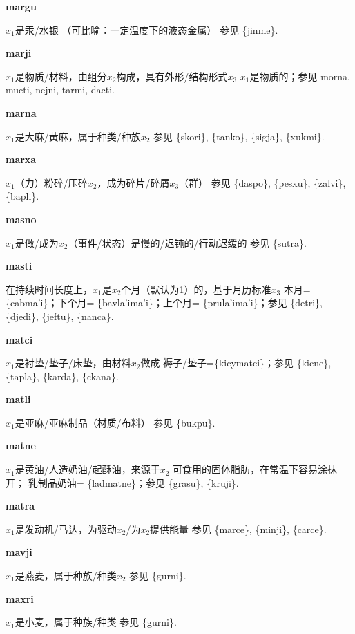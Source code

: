 \documentclass[notitlepage,twocolumn,a4paper,10pt]{book}
\begin{document}
{\sffamily\bfseries margu}\enspace {\ttfamily\bfseries[mag]}  $x_1$是汞\slash{}水银 （可比喻：一定温度下的液态金属） \textemdash{} 参见 \{jinme\}.

{\sffamily\bfseries marji}  $x_1$是物质\slash{}材料，由组分$x_2$构成，具有外形\slash{}结构形式$x_3$ \textemdash{} $x_1$是物质的；参见 {morna}, {mucti}, {nejni}, {tarmi}, {dacti}.

{\sffamily\bfseries marna} $x_1$是大麻\slash{}黄麻，属于种类\slash{}种族$x_2$ \textemdash{} 参见 \{skori\}, \{tanko\}, \{sigja\}, \{xukmi\}.

{\sffamily\bfseries marxa}\enspace {\ttfamily\bfseries[max]}  $x_1$（力）粉碎\slash{}压碎$x_2$，成为碎片\slash{}碎屑$x_3$（群） \textemdash{} 参见 \{daspo\}, \{pesxu\}, \{zalvi\}, \{bapli\}.

{\sffamily\bfseries masno}\enspace {\ttfamily\bfseries[    sno]}  $x_1$是做\slash{}成为$x_2$（事件\slash{}状态）是慢的\slash{}迟钝的\slash{}行动迟缓的 \textemdash{} 参见 \{sutra\}.

{\sffamily\bfseries masti}\enspace {\ttfamily\bfseries[        ma'i]}  在持续时间长度上，$x_1$是$x_2$个月（默认为1）的，基于月历标准$x_3$ \textemdash{} 本月= \{cabma'i\}；下个月= \{bavla'ima'i\}；上个月= \{prula'ima'i\}；参见 \{detri\}, \{djedi\}, \{jeftu\}, \{nanca\}.

{\sffamily\bfseries matci} $x_1$是衬垫\slash{}垫子\slash{}床垫，由材料$x_2$做成 \textemdash{} 褥子\slash{}垫子=\{kicymatci\}；参见 \{kicne\}, \{tapla\}, \{karda\}, \{ckana\}.

{\sffamily\bfseries matli} $x_1$是亚麻\slash{}亚麻制品（材质\slash{}布料） \textemdash{} 参见 \{bukpu\}.

{\sffamily\bfseries matne} $x_1$是黄油\slash{}人造奶油\slash{}起酥油，来源于$x_2$ \textemdash{} 可食用的固体脂肪，在常温下容易涂抹开； 乳制品奶油= \{ladmatne\}；参见 \{grasu\}, \{kruji\}.

{\sffamily\bfseries matra} $x_1$是发动机\slash{}马达，为驱动$x_2$\slash{}为$x_2$提供能量 \textemdash{} 参见 \{marce\}, \{minji\}, \{carce\}.

{\sffamily\bfseries mavji}\enspace {\ttfamily\bfseries[mav]}  $x_1$是燕麦，属于种族\slash{}种类$x_2$ \textemdash{} 参见 \{gurni\}.

{\sffamily\bfseries maxri}\enspace {\ttfamily\bfseries[    xri]}  $x_1$是小麦，属于种族\slash{}种类 \textemdash{} 参见 \{gurni\}.
\end{document}
